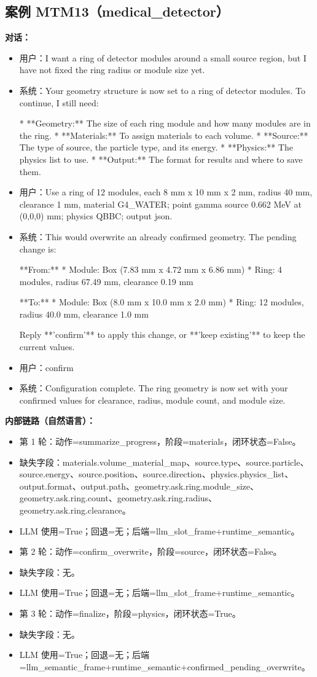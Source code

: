 \documentclass[11pt]{ctexart}
\begin{document}
\subsection{案例 MTM13（medical\_detector）}
\textbf{对话：}
\begin{itemize}
\item 用户：I want a ring of detector modules around a small source region, but I have not fixed the ring radius or module size yet.
\item 系统：Your geometry structure is now set to a ring of detector modules. To continue, I still need:

*   **Geometry:** The size of each ring module and how many modules are in the ring.
*   **Materials:** To assign materials to each volume.
*   **Source:** The type of source, the particle type, and its energy.
*   **Physics:** The physics list to use.
*   **Output:** The format for results and where to save them.
\item 用户：Use a ring of 12 modules, each 8 mm x 10 mm x 2 mm, radius 40 mm, clearance 1 mm, material G4\_WATER; point gamma source 0.662 MeV at (0,0,0) mm; physics QBBC; output json.
\item 系统：This would overwrite an already confirmed geometry. The pending change is:

**From:**
*   Module: Box (7.83 mm x 4.72 mm x 6.86 mm)
*   Ring: 4 modules, radius 67.49 mm, clearance 0.19 mm

**To:**
*   Module: Box (8.0 mm x 10.0 mm x 2.0 mm)
*   Ring: 12 modules, radius 40.0 mm, clearance 1.0 mm

Reply **'confirm'** to apply this change, or **'keep existing'** to keep the current values.
\item 用户：confirm
\item 系统：Configuration complete. The ring geometry is now set with your confirmed values for clearance, radius, module count, and module size.
\end{itemize}
\textbf{内部链路（自然语言）：}
\begin{itemize}
\item 第 1 轮：动作=summarize\_progress，阶段=materials，闭环状态=False。
\item 缺失字段：materials.volume\_material\_map、source.type、source.particle、source.energy、source.position、source.direction、physics.physics\_list、output.format、output.path、geometry.ask.ring.module\_size、geometry.ask.ring.count、geometry.ask.ring.radius、geometry.ask.ring.clearance。
\item LLM 使用=True；回退=无；后端=llm\_slot\_frame+runtime\_semantic。
\item 第 2 轮：动作=confirm\_overwrite，阶段=source，闭环状态=False。
\item 缺失字段：无。
\item LLM 使用=True；回退=无；后端=llm\_slot\_frame+runtime\_semantic。
\item 第 3 轮：动作=finalize，阶段=physics，闭环状态=True。
\item 缺失字段：无。
\item LLM 使用=True；回退=无；后端=llm\_semantic\_frame+runtime\_semantic+confirmed\_pending\_overwrite。
\end{itemize}
\end{document}
